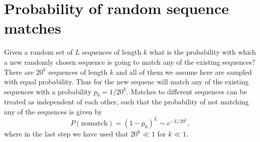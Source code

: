 \documentclass[superscriptaddress,twocolumn,pre]{revtex4}
\newcommand{\<}{\langle}
\renewcommand{\>}{\rangle}
\begin{document}






\section{Probability of random sequence matches}
 \label{secsequencematching}
Given a random set of $L$ sequences of length $k$ what is the probability with which a new randomly chosen sequence is going to match any of the existing sequences?
There are $20^k$ sequences of length $k$ and all of them we assume here are sampled with equal probability. Thus for the new sequenc will match any of the existing sequences with a probability $p_0 = 1/20^k$. Matches to different sequences can be treated as independent of each other, such that the probability of not matching any of the sequences is given by
\begin{equation}
    P(\mathrm{no match}) = (1-p_0)^L \sim e^{-L / 20^k},
\end{equation}
where in the last step we have used that $20^k \ll 1$ for $k \ll 1$.
\end{document}

